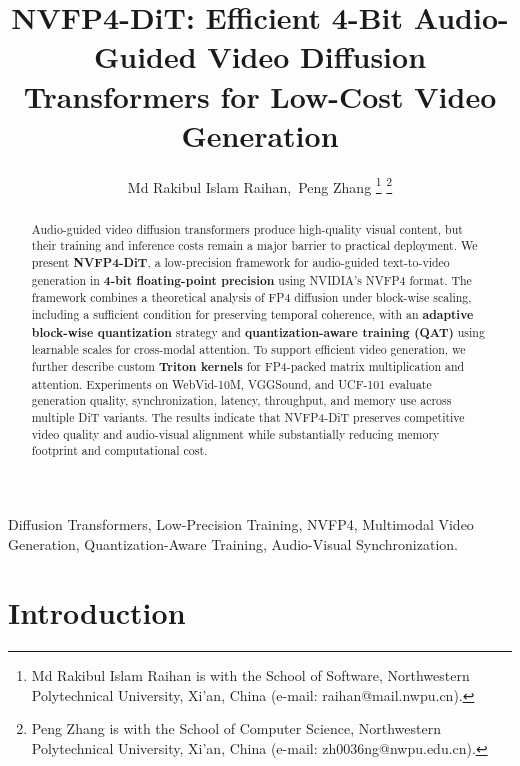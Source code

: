 \documentclass[journal,twoside]{IEEEtran}
\theoremstyle{definition}
\theoremstyle{remark}
\begin{document}
\title{NVFP4-DiT: Efficient 4-Bit Audio-Guided Video Diffusion Transformers for Low-Cost Video Generation}

\author{Md Rakibul Islam Raihan,~Peng Zhang%
\thanks{Md Rakibul Islam Raihan is with the School of Software, Northwestern Polytechnical University, Xi'an, China (e-mail: raihan@mail.nwpu.cn).}%
\thanks{Peng Zhang is with the School of Computer Science, Northwestern Polytechnical University, Xi'an, China (e-mail: zh0036ng@nwpu.edu.cn).}%
}

\maketitle

\begin{abstract}
Audio-guided video diffusion transformers produce high-quality visual content, but their training and inference costs remain a major barrier to practical deployment. We present \textbf{NVFP4-DiT}, a low-precision framework for audio-guided text-to-video generation in \textbf{4-bit floating-point precision} using NVIDIA's NVFP4 format. The framework combines a theoretical analysis of FP4 diffusion under block-wise scaling, including a sufficient condition for preserving temporal coherence, with an \textbf{adaptive block-wise quantization} strategy and \textbf{quantization-aware training (QAT)} using learnable scales for cross-modal attention. To support efficient video generation, we further describe custom \textbf{Triton kernels} for FP4-packed matrix multiplication and attention. Experiments on WebVid-10M, VGGSound, and UCF-101 evaluate generation quality, synchronization, latency, throughput, and memory use across multiple DiT variants. The results indicate that NVFP4-DiT preserves competitive video quality and audio-visual alignment while substantially reducing memory footprint and computational cost.
\end{abstract}

\begin{IEEEkeywords}
Diffusion Transformers, Low-Precision Training, NVFP4, Multimodal Video Generation, Quantization-Aware Training, Audio-Visual Synchronization.
\end{IEEEkeywords}

\section{Introduction}
\end{document}
